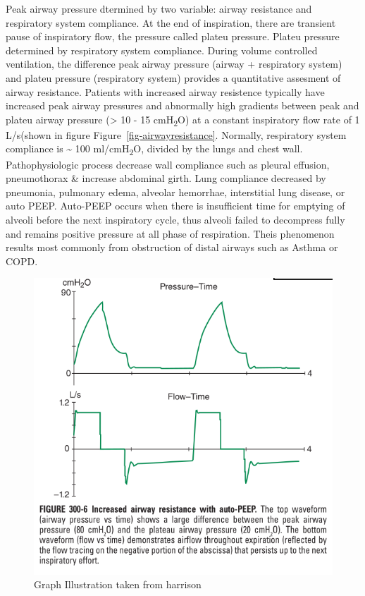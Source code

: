 \documentclass[
  letterpaper,
  DIV=11,
  numbers=noendperiod]{scrreprt}
\begin{document}
Peak airway pressure dtermined by two variable: airway resistance and
respiratory system compliance. At the end of inspiration, there are
transient pause of inspiratory flow, the pressure called plateu
pressure. Plateu pressure determined by respiratory system compliance.
During volume controlled ventilation, the difference peak airway
pressure (airway + respiratory system) and plateu pressure (respiratory
system) provides a quantitative assesment of airway resistance. Patients
with increased airway resistence typically have increased peak airway
pressures and abnormally high gradients between peak and plateu airway
pressure (\textgreater{} 10 - 15 cmH\textsubscript{2}O) at a constant
inspiratory flow rate of 1 L/s(shown in figure
Figure~\ref{fig-airwayresistance}. Normally, respiratory system
compliance is \textasciitilde{} 100 ml/cmH\textsubscript{2}O, divided by
the lungs and chest wall. Pathophysiologic process decrease wall
compliance such as pleural effusion, pneumothorax \& increase abdominal
girth. Lung compliance decreased by pneumonia, pulmonary edema, alveolar
hemorrhae, interstitial lung disease, or auto PEEP. Auto-PEEP occurs
when there is insufficient time for emptying of alveoli before the next
inspiratory cycle, thus alveoli failed to decompress fully and remains
positive pressure at all phase of respiration. Theis phenomenon results
most commonly from obstruction of distal airways such as Asthma or COPD.

\begin{figure}[H]

{\centering \includegraphics{Airway_resistance.png}

}

\caption{Graph Illustration taken from harrison}

\end{figure}%
\end{document}
